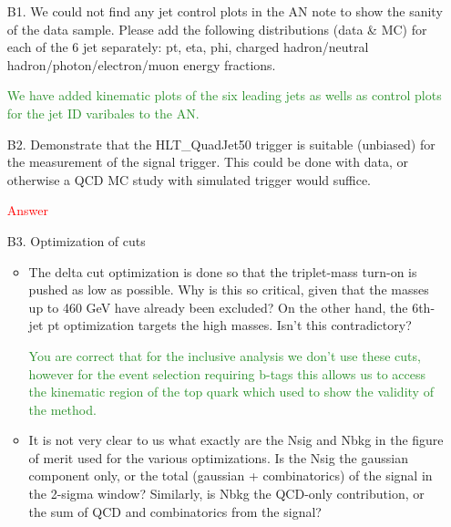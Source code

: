 \documentclass[paper=a4, fontsize=11pt]{scrartcl}
\begin{document}
\begin{itemize}

\item[B1.]  We could not find any jet control plots in the AN note to show the sanity of the data sample. Please add the following distributions (data \& MC) for each of the 6 jet separately: pt, eta, phi, charged hadron/neutral hadron/photon/electron/muon energy fractions.

\textcolor{ForestGreen}{We have added kinematic plots of the six leading jets as wells as control plots for the jet ID varibales to the AN.}\\

\item[B2.] Demonstrate that the HLT\_QuadJet50 trigger is suitable (unbiased) for the measurement of the signal trigger. This could be done with data, or otherwise a QCD MC study with simulated trigger would suffice.

\textcolor{red}{Answer}\\


\item[B3.] Optimization of cuts
\begin{itemize}

\item The delta cut optimization is done so that the triplet-mass turn-on is pushed as low as possible. Why is this so critical, given that the masses up to 460 GeV have already been excluded? On the other hand, the 6th-jet pt optimization targets the high masses. Isn't this contradictory?

\textcolor{ForestGreen}{You are correct that for the inclusive analysis we don't use these cuts, however for the event selection requiring b-tags this
allows us to access the kinematic region of the top quark which used to show the validity of the method.}\\

\item It is not very clear to us what exactly are the Nsig and Nbkg in the figure of merit used for the various optimizations. Is the Nsig the gaussian component only, or the total (gaussian + combinatorics) of the signal in the 2-sigma window? Similarly, is Nbkg the QCD-only contribution, or the sum of QCD and combinatorics from the signal?


\end{itemize}
\end{itemize}
\end{document}
